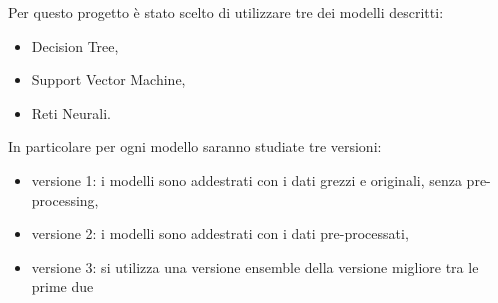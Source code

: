 Per questo progetto è stato scelto di utilizzare tre dei modelli descritti:
\begin{itemize}
\item Decision Tree,
\item Support Vector Machine,
\item Reti Neurali.
\end{itemize}

In particolare per ogni modello saranno studiate tre versioni:
\begin{itemize}
\item versione 1: i modelli sono addestrati con i dati grezzi e originali, senza pre-processing,
\item versione 2: i modelli sono addestrati con i dati pre-processati,
\item versione 3: si utilizza una versione ensemble della versione migliore tra le prime due
\end{itemize}